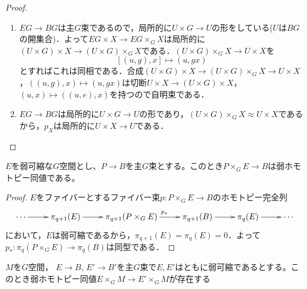 \begin{proof}
  \:
  \begin{enumerate}
    \item $EG\rightarrow BG$は主$G$束であるので，局所的に$U\times G\rightarrow U$の形をしている($U$は$BG$の開集合)．よって$EG\times X\rightarrow EG\times_G X$は局所的に$(U\times G)\times X\rightarrow (U\times G)\times_GX$である．$(U\times G)\times_GX\rightarrow U\times X$を
    \[
    [(u,g),x] \mapsto (u,gx)
    \]
    とすればこれは同相である．合成$(U\times G)\times X\rightarrow (U\times G)\times_GX\rightarrow U\times X$，$((u,g),x)\mapsto (u,gx)$は切断$U\times X\rightarrow (U\times G)\times X$，$(u,x)\mapsto((u,e),x)$を持つので自明束である．

    \item $EG\rightarrow BG$は局所的に$U\times G\rightarrow U$の形であり，$(U\times G)\times_GX\approx U\times X$であるから，$p_X$は局所的に$U\times X\rightarrow U$である．
  \end{enumerate}
\end{proof}

\begin{lemm}\label{borel const is weak hotmotopy equiv}
  $E$を弱可縮な$G$空間とし、$P\rightarrow B$を主$G$束とする。このとき$P\times_GE\rightarrow B$は弱ホモトピー同値である。
\end{lemm}

\begin{proof}
  $E$をファイバーとするファイバー束$p\colon P\times_GE\rightarrow B$のホモトピー完全列
  \[
  \xymatrix{
    \cdots \ar[r] & \pi_{q+1}(E) \ar[r] & \pi_{q+1}(P\times_GE) \ar[r]^{p_*} & \pi_{q+1}(B) \ar[r] & \pi_q(E) \ar[r] & \cdots
  }
  \]
  において，$E$は弱可縮であるから，$\pi_{q+1}(E)=\pi_{q}(E) = 0$．よって$p_*\colon\pi_q(P\times_GE)\rightarrow \pi_q(B)$は同型である．
\end{proof}

\begin{theo}\label{existance weak homotopy eq}
  $M$を$G$空間， $E\rightarrow B$, $E'\rightarrow B'$を主$G$束で$E,E'$はともに弱可縮であるとする。このとき弱ホモトピー同値$E\times_GM\rightarrow E'\times_GM$が存在する
\end{theo}

